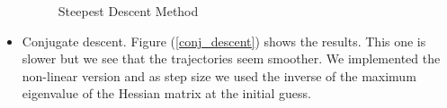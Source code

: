 \documentclass[a4paper,12pt]{article}
\begin{document}
\begin{itemize}
\begin{figure}[!htbp]
        \caption{Steepest Descent Method} 
        \label{steepest_des_fig}
    \end{figure}
        
        
        
        \item Conjugate descent. Figure (\ref{conj_descent}) shows the results. This one is slower but we see that the trajectories seem smoother. We implemented the non-linear version and as step size we used the inverse of the maximum eigenvalue of the Hessian matrix at the initial guess. 
        

\end{itemize}
\end{document}
